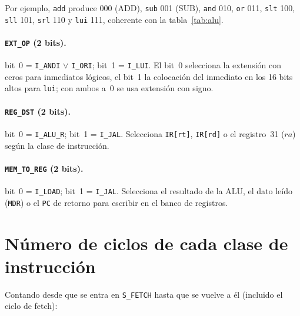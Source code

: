 \documentclass[11pt,a4paper]{article}
\begin{document}
Por ejemplo, \texttt{add} produce 000 (ADD), \texttt{sub} 001 (SUB), \texttt{and} 010, \texttt{or} 011, \texttt{slt} 100, \texttt{sll} 101, \texttt{srl} 110 y \texttt{lui} 111, coherente con la tabla~\ref{tab:alu}.

\paragraph{\texttt{EXT\_OP} (2 bits).} bit~0 = \texttt{I\_ANDI} $\lor$ \texttt{I\_ORI}; bit~1 = \texttt{I\_LUI}. El bit~0 selecciona la extensión con ceros para inmediatos lógicos, el bit~1 la colocación del inmediato en los 16 bits altos para \texttt{lui}; con ambos a~0 se usa extensión con signo.

\paragraph{\texttt{REG\_DST} (2 bits).} bit~0 = \texttt{I\_ALU\_R}; bit~1 = \texttt{I\_JAL}. Selecciona \texttt{IR[rt]}, \texttt{IR[rd]} o el registro~31 ($ra$) según la clase de instrucción.

\paragraph{\texttt{MEM\_TO\_REG} (2 bits).} bit~0 = \texttt{I\_LOAD}; bit~1 = \texttt{I\_JAL}. Selecciona el resultado de la ALU, el dato leído (\texttt{MDR}) o el \texttt{PC} de retorno para escribir en el banco de registros.

\section{Número de ciclos de cada clase de instrucción}

Contando desde que se entra en \texttt{S\_FETCH} hasta que se vuelve a él (incluido el ciclo de fetch):
\end{document}
